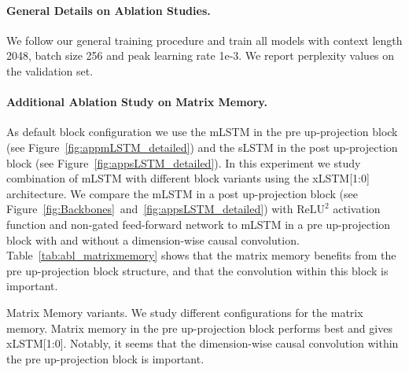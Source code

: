 \documentclass[dvipsnames]{article}
\begin{document}
\begin{appendix}
\paragraph{General Details on Ablation Studies.} 
\label{sec:appAblDetails}
We follow our general training procedure and train all models with context length 2048, batch size 256 and peak learning rate 1e-3. 
We report perplexity values on the validation set.

\pagebreak
 \paragraph{Additional Ablation Study on Matrix Memory.} As default block configuration we use the mLSTM in the pre up-projection block (see Figure~\ref{fig:appmLSTM_detailed}) and the sLSTM in the post up-projection block (see Figure~\ref{fig:appsLSTM_detailed}). 
In this experiment we study combination of mLSTM with different block variants using the xLSTM[1:0] architecture. 
We compare the mLSTM in a post up-projection block (see Figure~\ref{fig:Backbones}~and~\ref{fig:appsLSTM_detailed}) with $\text{ReLU}^2$ activation function and non-gated feed-forward network to mLSTM in a pre up-projection block with and without a dimension-wise causal convolution.
Table~\ref{tab:abl_matrixmemory} shows that the matrix memory benefits from the pre up-projection block structure, and that the convolution within this block is important.

\begin{table}[htbp]
    \centering
    \begin{adjustbox}{width=\textwidth}    
    
    \end{adjustbox}
    \vspace{0.1cm}
    \caption{Matrix Memory variants. We study different configurations for the matrix memory. Matrix memory in the pre up-projection block performs best and gives xLSTM[1:0]. Notably, it seems that the dimension-wise causal convolution within the pre up-projection block is important.}
    \label{tab:abl_matrixmemory}
\end{table}


\end{appendix}
\end{document}
